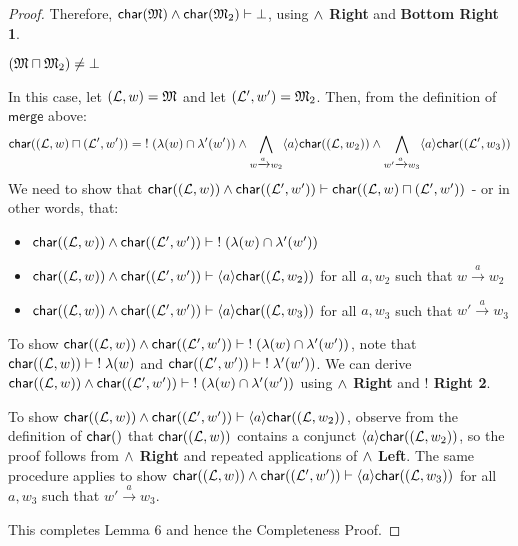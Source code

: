 \begin{proof}
Therefore,  $  \mathsf{char}(\frak{M}) \land  \mathsf{char}(\frak{M}_2) \vdash \bot$, using  {\bf $\land$ Right} and  {\bf Bottom Right 1}.
\begin{mycase}
$(\frak{M} \sqcap \frak{M}_2) \neq \bot$
\end{mycase}
In this case, let $(\mathcal{L},w) = \frak{M}$ and let $(\mathcal{L}',w')=\frak{M}_2$.
Then, from the definition of $\mathsf{merge}$ above:
\[
 \mathsf{char}((\mathcal{L},w) \sqcap (\mathcal{L}',w')) = \; ! \; (\lambda(w) \cap \lambda'(w')) \land \bigwedge_{w \xrightarrow{a} w_2} \langle a \rangle  \mathsf{char}((\mathcal{L}, w_2)) \land \bigwedge_{w' \xrightarrow{a} w_3} \langle a \rangle  \mathsf{char}((\mathcal{L}', w_3))
\]
We need to show that $ \mathsf{char}((\mathcal{L},w)) \land  \mathsf{char}((\mathcal{L}',w')) \vdash  \mathsf{char}((\mathcal{L},w) \sqcap (\mathcal{L}',w'))$ - or in other words, that:
\begin{itemize}
\item
$ \mathsf{char}((\mathcal{L},w)) \land  \mathsf{char}((\mathcal{L}',w')) \vdash \; ! \; (\lambda(w) \cap \lambda'(w'))$
\item
$ \mathsf{char}((\mathcal{L},w)) \land  \mathsf{char}((\mathcal{L}',w')) \vdash \langle a \rangle  \mathsf{char}((\mathcal{L}, w_2))$ for all $a,w_2$ such that $w \xrightarrow{a} w_2$
\item
$ \mathsf{char}((\mathcal{L},w)) \land  \mathsf{char}((\mathcal{L}',w')) \vdash \langle a \rangle  \mathsf{char}((\mathcal{L}, w_3))$ for all $a,w_3$ such that $w' \xrightarrow{a} w_3$
\end{itemize}
To show $ \mathsf{char}((\mathcal{L},w)) \land  \mathsf{char}((\mathcal{L}',w')) \vdash \; ! \; (\lambda(w) \cap \lambda'(w'))$, note that $ \mathsf{char}((\mathcal{L},w))  \vdash \; ! \; \lambda(w)$ and $ \mathsf{char}((\mathcal{L}',w')) \vdash \; ! \;  \lambda'(w'))$.
We can derive $ \mathsf{char}((\mathcal{L},w)) \land  \mathsf{char}((\mathcal{L}',w')) \vdash \; ! \; (\lambda(w) \cap \lambda'(w'))$ using {\bf $\land$ Right} and {\bf $!$ Right 2}. 

To show $ \mathsf{char}((\mathcal{L},w)) \land  \mathsf{char}((\mathcal{L}',w')) \vdash \langle a \rangle  \mathsf{char}((\mathcal{L}, w_2))$, observe from the definition of $ \CHAR$ that $ \mathsf{char}((\mathcal{L},w))$ contains a conjunct $\langle a \rangle  \mathsf{char}((\mathcal{L}, w_2))$, so the proof follows from  {\bf $\land$ Right} and repeated applications of  {\bf $\land$ Left}. The same procedure applies to show $ \mathsf{char}((\mathcal{L},w)) \land  \mathsf{char}((\mathcal{L}',w')) \vdash \langle a \rangle  \mathsf{char}((\mathcal{L}, w_3))$ for all $a,w_3$ such that $w' \xrightarrow{a} w_3$.

This completes Lemma 6 and hence the Completeness Proof.


\end{proof}
